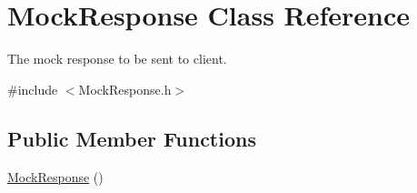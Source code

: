\hypertarget{class_mock_response}{\section{Mock\+Response Class Reference}
\label{class_mock_response}
}


The mock response to be sent to client.  




{\ttfamily \#include $<$Mock\+Response.\+h$>$}

\subsection*{Public Member Functions}
\begin{DoxyCompactItemize}
\item 
\hypertarget{class_mock_response_a1c7ead952ca453d9b39aa9b8bca1f12c}{\hyperlink{class_mock_response_a1c7ead952ca453d9b39aa9b8bca1f12c}{Mock\+Response} ()}\label{class_mock_response_a1c7ead952ca453d9b39aa9b8bca1f12c}


\end{DoxyCompactItemize}
